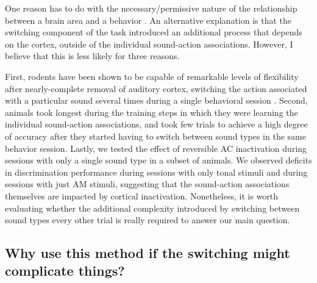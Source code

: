 One reason has to do with the necessary/permissive nature of the relationship
between a brain area and a behavior \citep{Otchy2015}.
An alternative explanation is that the switching component of the task
introduced an additional process that depends on the cortex, outside of the
individual sound-action associations. 
However, I believe that this is less likely for three reasons.

First, rodents have been shown to be capable of remarkable levels of
flexibility after nearly-complete removal of auditory cortex, switching the
action associated with a particular sound several times during a single
behavioral session \citep{Gimenez2015}.
%
Second, animals took longest during the training steps in which they were
learning the individual sound-action associations, and took few trials to
achieve a high degree of accuracy after they started having to switch between
sound types in the same behavior session.
Lastly, we tested the effect of reversible AC inactivation during sessions with
only a single sound type in a subset of animals.
%
We observed deficits in discrimination performance during sessions with only
tonal stimuli and during sessions with just AM stimuli, suggesting that the
sound-action associations themselves are impacted by cortical inactivation.
%
Nonetheless, it is worth evaluating whether the additional complexity
introduced by switching between sound types every other trial is really
required to answer our main question. 

\subsection{Why use this method if the switching might complicate things?}

